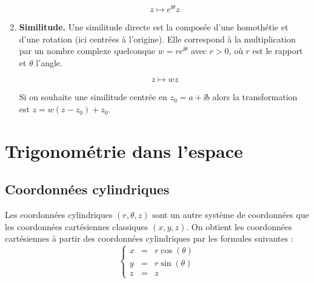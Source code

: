 \documentclass[11pt,class=report,crop=false]{standalone}
\begin{document}
\begin{enumerate}
	\begin{center}
	\begin{minipage}{0.45\textwidth}
	$$z \mapsto e^{\ii \theta} z$$	
	\end{minipage}
	\begin{minipage}{0.45\textwidth}
	\end{minipage}
	\end{center}


	\item \textbf{Similitude.}
	Une similitude directe est la composée d'une homothétie et d'une rotation (ici centrées à l'origine). Elle correspond à la multiplication par un nombre complexe quelconque $w = r e^{\ii \theta}$ avec $r>0$, où $r$ est le rapport et $\theta$ l'angle.
	
	\begin{center}
	\begin{minipage}{0.45\textwidth}
		$$z \mapsto w z$$	
	\end{minipage}
	\begin{minipage}{0.45\textwidth}
	\end{minipage}
	\end{center}

	Si on souhaite une similitude centrée en $z_0 = a + \ii b$ alors la transformation est 
	$z = w (z-z_0) + z_0$. 

\end{enumerate}



\section{Trigonométrie dans l'espace}

\subsection{Coordonnées cylindriques}


Les coordonnées cylindriques $(r,\theta,z)$ sont un autre système de coordonnées que les coordonnées cartésiennes classiques $(x,y,z)$. 
On obtient les coordonnées cartésiennes à partir des coordonnées cylindriques par les formules suivantes :
$$\left\{\begin{array}{rcl}
	x &=& r\cos(\theta) \\
	y &=& r\sin(\theta) \\	
	z &=& z
\end{array}\right.$$
\end{document}
